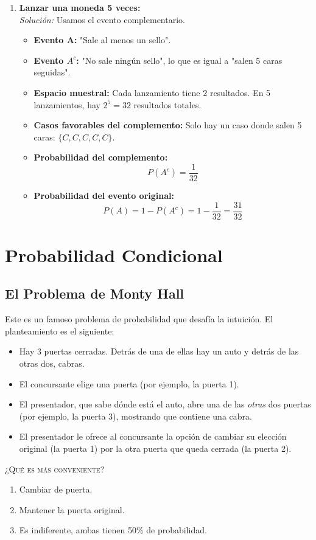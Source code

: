 \documentclass[12pt, letterpaper]{article}
\begin{document}
\begin{enumerate}
	\item \textbf{Lanzar una moneda 5 veces:} \\
	      \textit{Solución:} Usamos el evento complementario.
	      \begin{itemize}
		      \item \textbf{Evento A:} "Sale al menos un sello".
		      \item \textbf{Evento $A^c$:} "No sale ningún sello", lo que es igual a "salen 5 caras seguidas".
		      \item \textbf{Espacio muestral:} Cada lanzamiento tiene 2 resultados. En 5 lanzamientos, hay $2^5 = 32$ resultados totales.
		      \item \textbf{Casos favorables del complemento:} Solo hay un caso donde salen 5 caras: $\{C,C,C,C,C\}$.
		      \item \textbf{Probabilidad del complemento:}
		            \[ P(A^c) = \frac{1}{32} \]
		      \item \textbf{Probabilidad del evento original:}
		            \[ P(A) = 1 - P(A^c) = 1 - \frac{1}{32} = \frac{31}{32} \]
	      \end{itemize}
\end{enumerate}
\newpage

\section{Probabilidad Condicional}
\subsection{El Problema de Monty Hall}
Este es un famoso problema de probabilidad que desafía la intuición. El planteamiento es el siguiente:
\begin{itemize}
	\item Hay 3 puertas cerradas. Detrás de una de ellas hay un auto y detrás de las otras dos, cabras.
	\item El concursante elige una puerta (por ejemplo, la puerta 1).
	\item El presentador, que sabe dónde está el auto, abre una de las \textit{otras} dos puertas (por ejemplo, la puerta 3), mostrando que contiene una cabra.
	\item El presentador le ofrece al concursante la opción de cambiar su elección original (la puerta 1) por la otra puerta que queda cerrada (la puerta 2).
\end{itemize}
\begin{center}
	\textsc{\large{¿Qué es más conveniente?}}
\end{center}
\begin{enumerate}
	\item Cambiar de puerta.
	\item Mantener la puerta original.
	\item Es indiferente, ambas tienen 50\% de probabilidad.
\end{enumerate}
\end{document}
